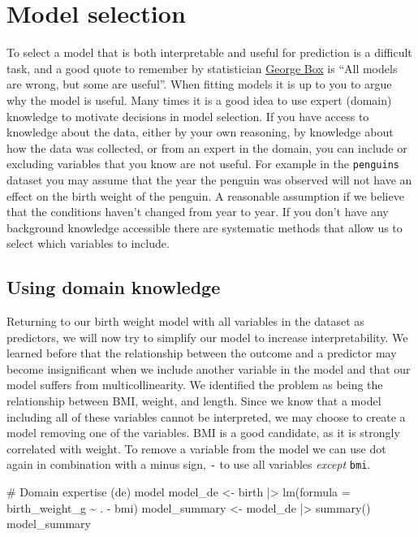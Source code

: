 \documentclass[
  letterpaper,
  DIV=11,
  numbers=noendperiod]{scrreprt}
\newenvironment{Shaded}{\begin{snugshade}}{\end{snugshade}}
\newcommand{\AttributeTok}[1]{\textcolor[rgb]{0.40,0.45,0.13}{#1}}
\newcommand{\CommentTok}[1]{\textcolor[rgb]{0.37,0.37,0.37}{#1}}
\newcommand{\FunctionTok}[1]{\textcolor[rgb]{0.28,0.35,0.67}{#1}}
\newcommand{\NormalTok}[1]{\textcolor[rgb]{0.00,0.23,0.31}{#1}}
\newcommand{\OtherTok}[1]{\textcolor[rgb]{0.00,0.23,0.31}{#1}}
\newcommand{\SpecialCharTok}[1]{\textcolor[rgb]{0.37,0.37,0.37}{#1}}
\begin{document}
\section{Model selection}\label{model-selection}

To select a model that is both interpretable and useful for prediction
is a difficult task, and a good quote to remember by statistician
\href{https://en.wikipedia.org/wiki/All_models_are_wrong}{George Box} is
``All models are wrong, but some are useful''. When fitting models it is
up to you to argue why the model is useful. Many times it is a good idea
to use expert (domain) knowledge to motivate decisions in model
selection. If you have access to knowledge about the data, either by
your own reasoning, by knowledge about how the data was collected, or
from an expert in the domain, you can include or excluding variables
that you know are not useful. For example in the \texttt{penguins}
dataset you may assume that the year the penguin was observed will not
have an effect on the birth weight of the penguin. A reasonable
assumption if we believe that the conditions haven't changed from year
to year. If you don't have any background knowledge accessible there are
systematic methods that allow us to select which variables to include.

\subsection{Using domain knowledge}\label{using-domain-knowledge}

Returning to our birth weight model with all variables in the dataset as
predictors, we will now try to simplify our model to increase
interpretability. We learned before that the relationship between the
outcome and a predictor may become insignificant when we include another
variable in the model and that our model suffers from multicollinearity.
We identified the problem as being the relationship between BMI, weight,
and length. Since we know that a model including all of these variables
cannot be interpreted, we may choose to create a model removing one of
the variables. BMI is a good candidate, as it is strongly correlated
with weight. To remove a variable from the model we can use dot again in
combination with a minus sign, \texttt{-} to use all variables
\emph{except} \texttt{bmi}.

\begin{Shaded}
\begin{Highlighting}[]
\CommentTok{\# Domain expertise (de) model}
\NormalTok{model\_de }\OtherTok{\textless{}{-}}\NormalTok{ birth }\SpecialCharTok{|\textgreater{}} 
  \FunctionTok{lm}\NormalTok{(}\AttributeTok{formula =}\NormalTok{ birth\_weight\_g }\SpecialCharTok{\textasciitilde{}}\NormalTok{ . }\SpecialCharTok{{-}}\NormalTok{ bmi)}
\NormalTok{model\_summary }\OtherTok{\textless{}{-}}\NormalTok{ model\_de }\SpecialCharTok{|\textgreater{}} \FunctionTok{summary}\NormalTok{()}
\NormalTok{model\_summary}
\end{Highlighting}
\end{Shaded}
\end{document}
